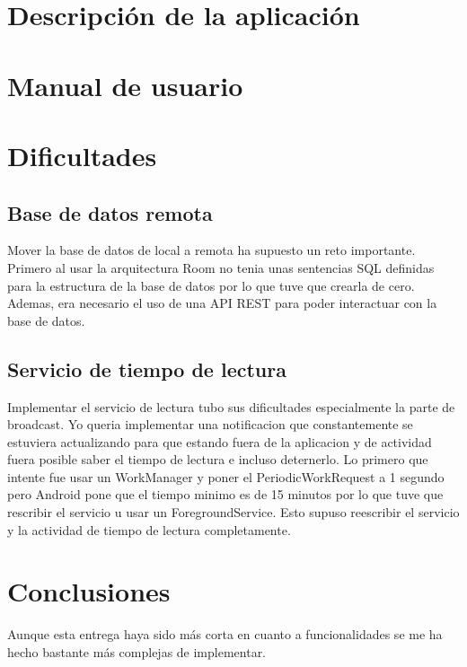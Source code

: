 \documentclass[a4paper,12pt]{report}
\begin{document}
  \chapter{Descripción de la aplicación}
  \chapter{Manual de usuario}
  \chapter{Dificultades}
    \section{Base de datos remota}
      Mover la base de datos de local a remota ha supuesto un reto importante.
      Primero al usar la arquitectura Room no tenia unas sentencias SQL definidas para la estructura de la base de datos por lo que tuve que crearla de cero.
      Ademas, era necesario el uso de una API REST para poder interactuar con la base de datos.
    \section{Servicio de tiempo de lectura}
      Implementar el servicio de lectura tubo sus dificultades especialmente la parte de broadcast.
      Yo queria implementar una notificacion que constantemente se estuviera actualizando para que estando fuera de la aplicacion y de actividad fuera posible saber el tiempo de lectura e incluso deternerlo.
      Lo primero que intente fue usar un WorkManager y poner el PeriodicWorkRequest a 1 segundo pero Android pone que el tiempo minimo es de 15 minutos por lo que tuve que rescribir el servicio u usar un ForegroundService.
      Esto supuso reescribir el servicio y la actividad de tiempo de lectura completamente.
  \chapter{Conclusiones}
    Aunque esta entrega haya sido más corta en cuanto a funcionalidades se me ha hecho bastante más complejas de implementar.
\end{document}
